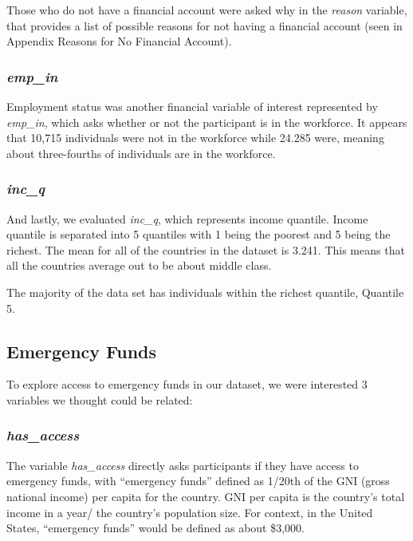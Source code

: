 \documentclass[water,article,submit,moreauthors,pdftex]{mdpi}
\begin{document}
Those who do not have a financial account were asked why in the
\emph{reason} variable, that provides a list of possible reasons for not
having a financial account (seen in Appendix Reasons for No Financial
Account).

\hypertarget{emp_in}{%
\subsubsection{\texorpdfstring{\emph{emp\_in}}{emp\_in}}\label{emp_in}}

Employment status was another financial variable of interest represented
by \emph{emp\_in}, which asks whether or not the participant is in the
workforce. It appears that 10,715 individuals were not in the workforce
while 24.285 were, meaning about three-fourths of individuals are in the
workforce.

\hypertarget{inc_q}{%
\subsubsection{\texorpdfstring{\emph{inc\_q}}{inc\_q}}\label{inc_q}}

And lastly, we evaluated \emph{inc\_q}, which represents income
quantile. Income quantile is separated into 5 quantiles with 1 being the
poorest and 5 being the richest. The mean for all of the countries in
the dataset is 3.241. This means that all the countries average out to
be about middle class.

The majority of the data set has individuals within the richest
quantile, Quantile 5.

\hypertarget{emergency-funds}{%
\subsection{Emergency Funds}\label{emergency-funds}}

To explore access to emergency funds in our dataset, we were interested
3 variables we thought could be related:

\hypertarget{has_access}{%
\subsubsection{\texorpdfstring{\emph{has\_access}}{has\_access}}\label{has_access}}

The variable \emph{has\_access} directly asks participants if they have
access to emergency funds, with ``emergency funds'' defined as 1/20th of
the GNI (gross national income) per capita for the country. GNI per
capita is the country's total income in a year/ the country's population
size. For context, in the United States, ``emergency funds'' would be
defined as about \$3,000.
\end{document}
